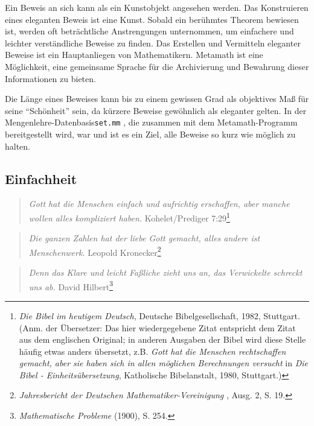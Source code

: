 Ein Beweis an sich kann als ein Kunstobjekt angesehen werden.  Das Konstruieren eines eleganten Beweis ist eine Kunst.  Sobald ein berühmtes Theorem bewiesen ist, werden oft beträchtliche Anstrengungen unternommen, um einfachere und leichter verständliche Beweise zu finden.  Das Erstellen und Vermitteln eleganter Beweise ist ein Hauptanliegen von Mathematikern.  Metamath ist eine Möglichkeit, eine gemeinsame Sprache für die Archivierung und Bewahrung dieser Informationen zu bieten.

Die Länge eines Beweises kann bis zu einem gewissen Grad als objektives Maß für seine "`Schönheit"' sein, da kürzere Beweise gewöhnlich als eleganter gelten.  In der Mengenlehre-Datenbasis\texttt{set.mm}%
, die zusammen mit dem Metamath-Programm bereitgestellt wird, war und ist es ein Ziel, alle Beweise so kurz wie möglich zu halten.

\subsection{Einfachheit}

\begin{quote}
  {\em Gott hat die Menschen einfach und aufrichtig erschaffen, aber manche wollen alles kompliziert haben.}
    \flushright\sc Kohelet/Prediger 7:29\footnote{{\em Die Bibel im heutigem Deutsch}, Deutsche Bibelgesellschaft, 1982, Stuttgart. (Anm. der Übersetzer: Das hier wiedergegebene Zitat entspricht dem Zitat aus dem englischen Original; in anderen Ausgaben der Bibel wird diese Stelle häufig etwas anders übersetzt, z.B. {\em Gott hat die Menschen rechtschaffen gemacht, aber sie haben sich in allen möglichen Berechnungen versucht} in {\em Die Bibel - Einheitsübersetzung}, Katholische Bibelanstalt, 1980, Stuttgart.)}\\
\end{quote}

\begin{quote}
  {\em Die ganzen Zahlen hat der liebe Gott gemacht, alles andere ist Menschenwerk.}
    \flushright\sc Leopold Kronecker\footnote{{\em Jahresbericht
	der Deutschen Mathematiker-Vereinigung }, Ausg. 2, S. 19.}\\
\end{quote}

\begin{quote}
  {\em Denn das Klare und leicht Faßliche zieht uns an, das Verwickelte schreckt uns ab.}
    \flushright\sc David Hilbert\footnote{{\em Mathematische Probleme} (1900), S. 254.}\\
\end{quote}

